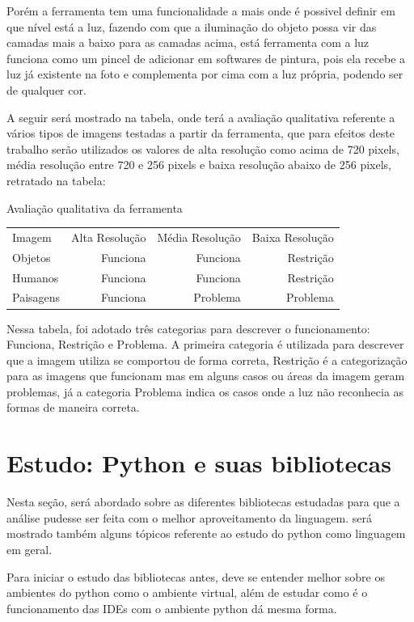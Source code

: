 Porém a ferramenta tem uma funcionalidade a mais onde é possivel definir em que nível está a luz, fazendo com que a iluminação do objeto possa vir das camadas mais a baixo para as camadas acima, está ferramenta com a luz funciona como um pincel de adicionar em softwares de pintura, pois ela recebe a luz já existente na foto e complementa por cima com a luz própria, podendo ser de qualquer cor.

A seguir será mostrado na tabela, onde terá a avaliação qualitativa referente a vários tipos de imagens testadas a partir da ferramenta, que para efeitos deste trabalho serão utilizados os valores de alta resolução como acima de 720 pixels, média resolução entre 720 e 256 pixels e baixa resolução abaixo de 256 pixels, retratado na tabela:

Avaliação qualitativa da ferramenta

\begin{tabular}{l r r r}
    Imagem    & Alta Resolução & Média Resolução & Baixa Resolução \\
    Objetos   & Funciona       & Funciona        & Restrição       \\
    Humanos   & Funciona       & Funciona        & Restrição       \\
    Paisagens & Funciona       & Problema        & Problema        \\
\end{tabular}

Nessa tabela, foi adotado três categorias para descrever o funcionamento: Funciona, Restrição e Problema.
A primeira categoria é utilizada para descrever que a imagem utiliza se comportou de forma correta, Restrição é a categorização para as imagens que funcionam mas em alguns casos ou áreas da imagem geram problemas, já a categoria Problema indica os casos onde a luz não reconhecia as formas de maneira correta.

\section{Estudo: Python e suas bibliotecas}
Nesta seção, será abordado sobre as diferentes bibliotecas estudadas para que a análise pudesse ser feita com o melhor aproveitamento da linguagem.
será mostrado também alguns tópicos referente ao estudo do python como linguagem em geral.

Para iniciar o estudo das bibliotecas antes, deve se entender melhor sobre os ambientes do python como o ambiente virtual, além de estudar como é o funcionamento das IDEs com o ambiente python dá mesma forma.


